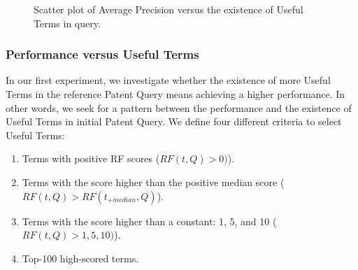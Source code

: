 \begin{figure}[t!]
\begin{centering}
 \hspace*{1.5cm} 
\par\end{centering}

\protect\caption{Scatter plot of Average Precision versus the existence of Useful Terms in query.}
\label{fig:overlap-p}
\end{figure}
\subsubsection{Performance versus Useful Terms}
\label{PerformanceUsefulTerms}
In our first experiment, we investigate whether the existence of more Useful Terms in the reference Patent Query means achieving a higher performance. In other words, we seek for a pattern between the performance and the existence of Useful Terms in initial Patent Query. We define four different criteria to select Useful Terms:
\begin{enumerate}
\item Terms with positive RF scores ($ RF(t, Q)>0) $).
\item Terms with the score higher than the positive median score ($ RF(t, Q)>RF(t_{+median}, Q) $).
\item Terms with the score higher than a constant: 1, 5, and 10 ($ RF(t, Q)>1, 5, 10) $).
\item Top-100 high-scored terms.
\end{enumerate}

